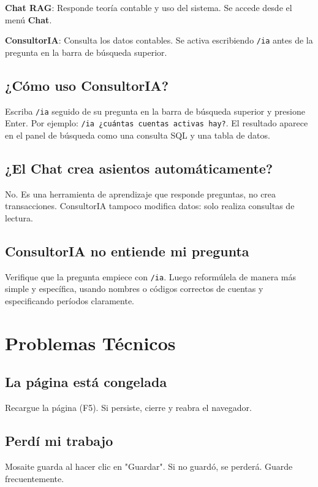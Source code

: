 \textbf{Chat RAG}: Responde teoría contable y uso del sistema. Se accede desde el menú \textbf{Chat}.

\textbf{ConsultorIA}: Consulta los datos contables. Se activa escribiendo \texttt{/ia} antes de la pregunta en la barra de búsqueda superior.

\subsection{¿Cómo uso ConsultorIA?}

Escriba \texttt{/ia} seguido de su pregunta en la barra de búsqueda superior y presione Enter. Por ejemplo: \texttt{/ia ¿cuántas cuentas activas hay?}. El resultado aparece en el panel de búsqueda como una consulta SQL y una tabla de datos.

\subsection{¿El Chat crea asientos automáticamente?}

No. Es una herramienta de aprendizaje que responde preguntas, no crea transacciones. ConsultorIA tampoco modifica datos: solo realiza consultas de lectura.

\subsection{ConsultorIA no entiende mi pregunta}

Verifique que la pregunta empiece con \texttt{/ia}. Luego reformúlela de manera más simple y específica, usando nombres o códigos correctos de cuentas y especificando períodos claramente.

\section{Problemas Técnicos}

\subsection{La página está congelada}

Recargue la página (F5). Si persiste, cierre y reabra el navegador.

\subsection{Perdí mi trabajo}

Mosaite guarda al hacer clic en "Guardar". Si no guardó, se perderá. Guarde frecuentemente.


